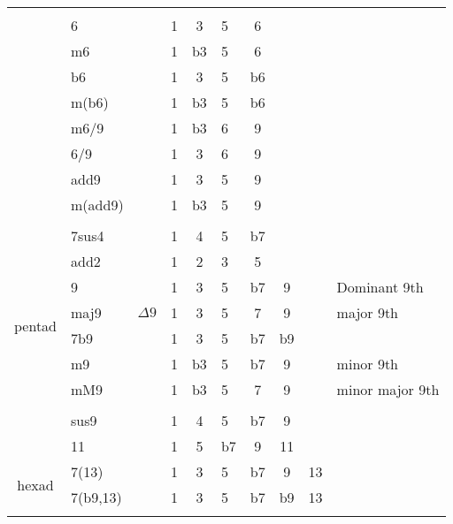 \begin{table*}[!h]
\begin{tabular}{clccclcccl}
		\hline \vspace{-0.2cm} \\
							   & 6       & & 1 & 3  & 5 & 6   &   & \\
                               & m6      & & 1 & b3  & 5 & 6   &   & \\
							   & b6      & & 1 & 3  & 5 & b6   &   & \\
                               & m(b6)   & & 1 & b3  & 5 & b6   &   & \\
		                       & m6/9    & & 1 & b3  & 6 & 9  &   & \\
		                       & 6/9     & & 1 & 3  & 6 & 9  &   & \\
		                       & add9    & & 1 & 3  & 5 & 9  &   & \\
		  					   & m(add9) & & 1 & b3  & 5 & 9  &   & \\
		\hline  \vspace{-0.2cm} \\
							   & 7sus4   & & 1 & 4   & 5 & b7  &  & \\
		                       & add2    & & 1 & 2  & 3 & 5   &  & \\
		\hline
		\multirow{4}{*}{pentad}& 9     & & 1 & 3  & 5 & b7  & 9  & & Dominant 9th \\
	                           & maj9  &$\Delta9$  & 1 & 3  & 5 & 7  & 9  & & major 9th \\
		                       & 7b9 & & 1 & 3  & 5 & b7  & b9  &\\
		                       & m9    & & 1 & b3  & 5 & b7  & 9  & & minor 9th \\
							   & mM9    & & 1 & b3  & 5 & 7  & 9  & & minor major 9th\\
		\hline  \vspace{-0.2cm} \\
		                       & sus9  & & 1 & 4   & 5 & b7  & 9  & \\
		                       & 11    & & 1 & 5   & b7 & 9  & 11  & \\ %
		\hline
		\multirow{2}{*}{hexad} & 7(13)     & & 1 & 3  & 5 & b7  & 9  & 13\\ %
		                       & 7(b9,13)  & & 1 & 3  & 5 & b7  & b9  & 13\\
		\hline \vspace{-0.2cm}
	\end{tabular}
	\label{tab: }
\end{table*}